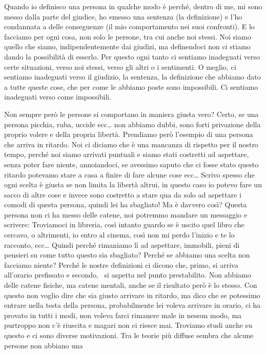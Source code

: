 \documentclass[12pt]{book} %
\begin{document}
Quando io definisco una persona in qualche modo è perché, dentro di me, mi sono messo dalla parte del giudice, ho emesso
una sentenza (la definizione) e l'ho condannata a delle conseguenze (il mio comportamento nei suoi
confronti). E lo facciamo per ogni cosa, non solo le persone, tra cui anche noi stessi. Noi siamo quello che siamo,
indipendentemente dai giudizi, ma definendoci non ci stiamo dando la possibilità di esserlo. Per questo ogni tanto ci
sentiamo inadeguati verso certe situazioni, verso noi stessi, verso gli altri o i sentimenti. O meglio, ci sentiamo
inadeguati verso il giudizio, la sentenza, la definizione che abbiamo dato a tutte queste cose, che per come le abbiamo
poste sono impossibili. Ci sentiamo inadeguati verso come impossibili.

Non sempre però le persone si comportano in maniera giusta vero? Certo, se una persona picchia, ruba, uccide ecc… non
abbiamo dubbi, sono forti privazione della proprio volere e della propria libertà. Prendiamo però
l'esempio di una persona che arriva in ritardo. Noi ci diciamo che è una mancanza di rispetto per
il nostro tempo, perché noi siamo arrivati puntuali e siamo stati costretti ad aspettare, senza poter fare niente,
annoiandoci, se avessimo saputo che ci fosse stato questo ritardo potevamo stare a casa a finire di fare alcune cose
ecc… Scrivo spesso che ogni scelta è giusta se non limita la libertà altrui, in questo caso io potevo fare un sacco di
altre cose e invece sono costretto a stare qua da solo ad aspettare i comodi di questa persona, quindi lei ha
sbagliato! Ma è davvero così? Questa persona non ci ha messo delle catene, noi potremmo mandare un messaggio e
scrivere: Troviamoci in libreria, così intanto guardo se è uscito quel libro che cercavo, o altrimenti, io entro al
cinema, così non mi perdo l'inizio e te lo racconto, ecc… Quindi perché rimaniamo lì ad aspettare,
immobili, pieni di pensieri su come tutto questo sia sbagliato? Perché se abbiamo una scelta non facciamo niente?
Perché le nostre definizioni ci dicono che, primo, si arriva all'orario prefissato e secondo, \ si
aspetta nel punto prestabilito. Non abbiamo delle catene fisiche, ma catene mentali, anche se il risultato però è lo
stesso. Con questo non voglio dire che sia giusto arrivare in ritardo, ma dico che se potessimo entrare nella testa
della persona, probabilmente lei voleva arrivare in orario, ci ha provato in tutti i modi, non voleva farci rimanere
male in nessun modo, ma purtroppo non c'è riuscita e magari non ci riesce mai. Troviamo studi
anche su questo e ci sono diverse motivazioni. Tra le teorie più diffuse sembra che alcune persone non abbiano una
\end{document}

